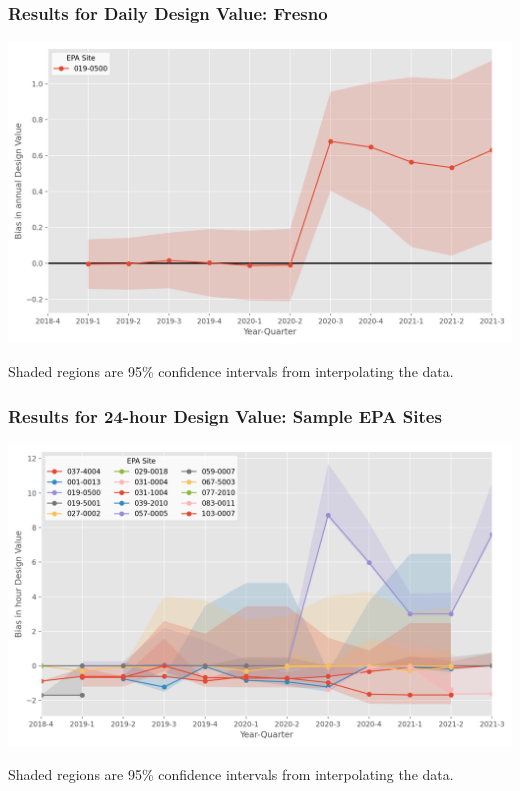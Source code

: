 \documentclass{beamer}
\begin{document}
\begin{frame}
\frametitle{Results for Daily Design Value: Fresno}


\includegraphics[width=\textwidth]{output/figures/final_results/DV_annual_plot_site_019-0500.png}


{\small Shaded regions are 95\% confidence intervals from interpolating the data.}
\end{frame}


\begin{frame}
\frametitle{Results for 24-hour Design Value: Sample EPA Sites}
\includegraphics[width=\textwidth]{output/figures/final_results/DV_hour_plot_all_test_sites.png}

{\small Shaded regions are 95\% confidence intervals from interpolating the data.}
\end{frame}
\end{document}
